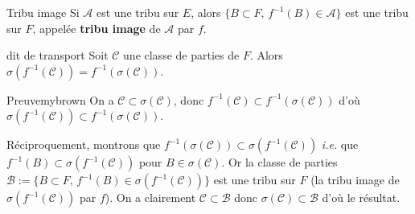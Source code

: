     \begin{defi}{Tribu image}{}
        Si $\mathcal{A}$ est une tribu sur $E$, alors $\{ B \subset F, \, f^{-1}(B) \in \mathcal{A} \}$ est une tribu sur $F$, appelée \textbf{tribu image} de $\mathcal{A}$ par $f$.
    \end{defi}

    \begin{lem}{dit de transport}{}
        Soit $\mathcal{C}$ une classe de parties de $F$. Alors $\sigma(f^{-1}(\mathcal{C})) = f^{-1}(\sigma(\mathcal{C}))$.
    \end{lem}

    \begin{demo}{Preuve}{mybrown}
        On a $\mathcal{C} \subset \sigma(\mathcal{C})$, donc $f^{-1}(\mathcal{C}) \subset f^{-1}(\sigma(\mathcal{C}))$ d’où $\sigma(f^{-1}(\mathcal{C})) \subset f^{-1}(\sigma(\mathcal{C}))$.

        Réciproquement, montrons que $f^{-1}(\sigma(\mathcal{C})) \subset \sigma(f^{-1}(\mathcal{C}))$ \textit{i.e.} que $f^{-1}(B) \subset \sigma(f^{-1}(\mathcal{C}))$ pour $B \in \sigma(\mathcal{C})$. Or la classe de parties $\mathcal{B} := \{ B \subset F, \, f^{-1}(B) \in \sigma(f^{-1}(\mathcal{C}))\}$ est une tribu sur $F$ (la tribu image de $\sigma(f^{-1}(\mathcal{C}))$ par $f$). On a clairement $\mathcal{C} \subset \mathcal{B}$ donc $\sigma(\mathcal{C}) \subset \mathcal{B}$ d’où le résultat.
    \end{demo}




    